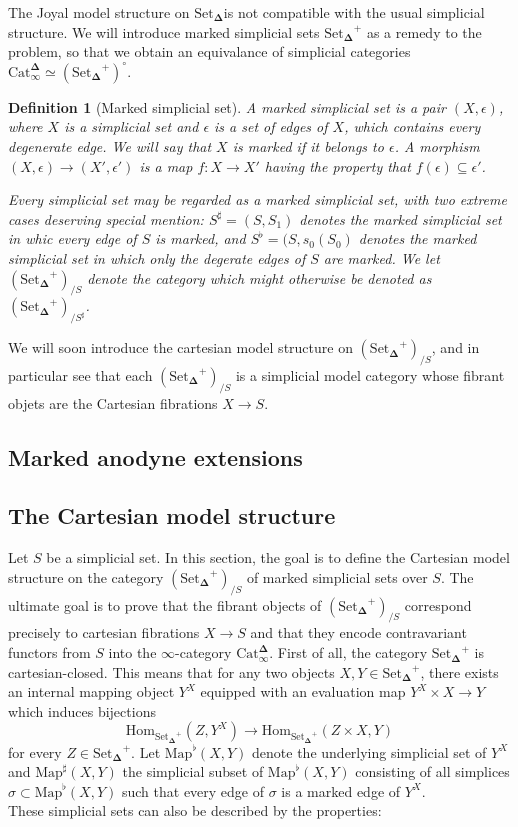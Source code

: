 \documentclass{amsart}
\newcommand{\8}{\ensuremath{\infty}}
\newcommand{\SSet}{\ensuremath{\text{Set}_{\boldsymbol{\Delta}}}}
\newcommand{\Catinfdel}{\ensuremath{\text{Cat}^{\boldsymbol{\Delta}}_{\infty}}}
\newcommand{\Map}{\ensuremath{\text{Map}}}
\newcommand{\Hom}{\ensuremath{\text{Hom}}}
\newtheorem{definition}{Definition}
\begin{document}
The Joyal model structure on \SSet is not compatible with the usual simplicial structure. We will introduce marked simplicial sets $\SSet^+$ as a remedy to the problem, so that we obtain an equivalance of simplicial categories $\Catinfdel \simeq (\SSet^+)^\circ$.

\begin{definition}[Marked simplicial set]
  A marked simplicial set is a pair $(X, \epsilon)$, where $X$ is a simplicial set and $\epsilon$ is a set of edges of $X$, which contains every degenerate edge. We will say that $X$ is marked if it belongs to $\epsilon$. A morphism $(X, \epsilon) \rightarrow (X', \epsilon')$ is a map $f : X \rightarrow X'$ having the property that $f(\epsilon) \subseteq \epsilon'$.

  Every simplicial set may be regarded as a marked simplicial set, with two extreme cases deserving special mention: $S^\sharp = (S, S_1)$ denotes the marked simplicial set in whic every edge of $S$ is marked, and $S^\flat = (S, s_0(S_0)$ denotes the marked simplicial set in which only the degerate edges of $S$ are marked. We let $(\SSet^+)_{/S}$ denote the category which might otherwise be denoted as $(\SSet^+)_{/S^\sharp}$.
\end{definition}

We will soon introduce the cartesian model structure on $(\SSet^+)_{/S}$, and in particular see that each $(\SSet^+)_{/S}$ is a simplicial model category whose fibrant objets are the Cartesian fibrations $X \rightarrow S$.

\subsection{Marked anodyne extensions}

\subsection{The Cartesian model structure}
Let $S$ be a simplicial set. In this section, the goal is to define the Cartesian model structure on the category $(\SSet^+)_{/S}$ of marked simplicial sets over $S$. The ultimate goal is to prove that the fibrant objects of $(\SSet^+)_{/S}$ correspond precisely to cartesian fibrations $X\rightarrow S$ and that they encode contravariant functors from $S$ into the \8-category \Catinfdel.
First of all, the category $\SSet^+$ is cartesian-closed. This means that for any two objects $X,Y\in \SSet^+$, there exists an internal mapping object $Y^X$ equipped with an evaluation map $Y^X\times X\rightarrow Y$ which induces bijections
\[\Hom_{\SSet^+}(Z,Y^X)\rightarrow \Hom_{\SSet^+}(Z\times X,Y)\]
for every $Z\in\SSet^+$. Let $\Map^\flat(X,Y)$ denote the underlying simplicial set of $Y^X$ and $\Map^\sharp(X,Y)$ the simplicial subset of $\Map^\flat(X,Y)$ consisting of all simplices $\sigma\subset \Map^\flat(X,Y)$ such that every edge of $\sigma$ is a marked edge of $Y^X$.\\
These simplicial sets can also be described by the properties:
\end{document}
